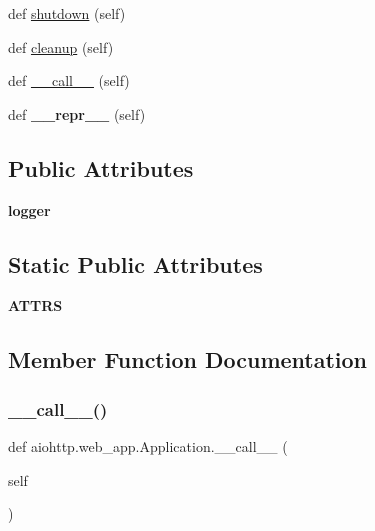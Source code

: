 \begin{DoxyCompactItemize}
$$\item 
def \hyperlink{classaiohttp_1_1web__app_1_1_application_a0ed1cc57e63c16f0ca64ddcd9e8bb4a5}{shutdown} (self)
\item 
def \hyperlink{classaiohttp_1_1web__app_1_1_application_abce66e10914b0ee525ea5142c706e9bc}{cleanup} (self)
\item 
def \hyperlink{classaiohttp_1_1web__app_1_1_application_a133d996cc9ce9c2b771dd459cbe72b1a}{\+\_\+\+\_\+call\+\_\+\+\_\+} (self)
\item 
\mbox{\label{classaiohttp_1_1web__app_1_1_application_a2480a31e074750405723822591f5e9f4}} 
def {\bfseries \+\_\+\+\_\+repr\+\_\+\+\_\+} (self)
\end{DoxyCompactItemize}
\subsection*{Public Attributes}
\begin{DoxyCompactItemize}
\item 
\mbox{\label{classaiohttp_1_1web__app_1_1_application_a26ffa9a296dbd7783f7d185c84e05541}} 
{\bfseries logger}
\end{DoxyCompactItemize}
\subsection*{Static Public Attributes}
\begin{DoxyCompactItemize}
\item 
{\bfseries A\+T\+T\+RS}
\end{DoxyCompactItemize}


\subsection{Member Function Documentation}
\mbox{\label{classaiohttp_1_1web__app_1_1_application_a133d996cc9ce9c2b771dd459cbe72b1a}} 
\subsubsection{\texorpdfstring{\+\_\+\+\_\+call\+\_\+\+\_\+()}{\_\_call\_\_()}}
{\footnotesize\ttfamily def aiohttp.\+web\+\_\+app.\+Application.\+\_\+\+\_\+call\+\_\+\+\_\+ (\begin{DoxyParamCaption}\item[{}]{self }\end{DoxyParamCaption})}

